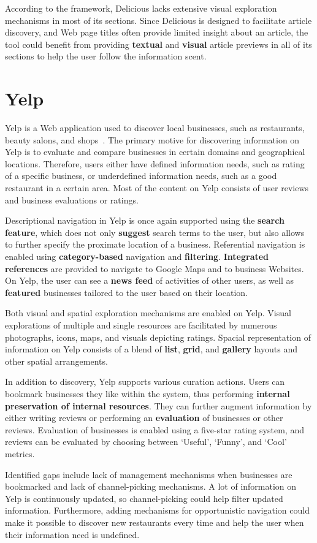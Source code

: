 {According to the framework, Delicious lacks extensive visual exploration mechanisms in most of its sections. Since Delicious is designed to facilitate article discovery, and Web page titles often provide limited insight about an article, the tool could benefit from providing \textbf{textual} and \textbf{visual} article previews in all of its sections to help the user follow the information scent. 
} %

{\section{Yelp}
Yelp is a Web application used to discover local businesses, such as restaurants, beauty salons, and shops~\cite{luca2011reviews}. The primary motive for discovering information on Yelp is to evaluate and compare businesses in certain domains and geographical locations. Therefore, users either have defined information needs, such as rating of a specific business, or underdefined information needs, such as a good restaurant in a certain area. Most of the content on Yelp consists of user reviews and business evaluations or ratings. 

Descriptional navigation in Yelp is once again supported using the \textbf{search feature}, which does not only \textbf{suggest} search terms to the user, but also allows to further specify the proximate location of a business. Referential navigation is enabled using \textbf{category-based} navigation and \textbf{filtering}. \textbf{Integrated references} are provided to navigate to Google Maps and to business Websites.  On Yelp, the user can see a \textbf{news feed} of activities of other users, as well as \textbf{featured} businesses tailored to the user based on their location. 

Both visual and spatial exploration mechanisms are enabled on Yelp. Visual explorations of multiple and single resources are facilitated by numerous photographs, icons, maps, and visuals depicting ratings. Spacial representation of information on Yelp consists of a blend of \textbf{list}, \textbf{grid}, and \textbf{gallery} layouts and other spatial arrangements.

In addition to discovery, Yelp supports various curation actions. Users can bookmark businesses they like within the system, thus performing \textbf{internal preservation of internal resources}. They can further augment information by either writing reviews or performing an \textbf{evaluation} of businesses or other reviews. Evaluation of businesses is enabled using a five-star rating system, and reviews can be evaluated by choosing between `Useful', `Funny', and `Cool' metrics. 

Identified gaps include lack of management mechanisms when businesses are bookmarked and lack of channel-picking mechanisms. A lot of information on Yelp is continuously updated, so channel-picking could help filter updated information. Furthermore, adding mechanisms for opportunistic navigation could make it possible to discover new restaurants every time and help the user when their information need is undefined.
 
} %

